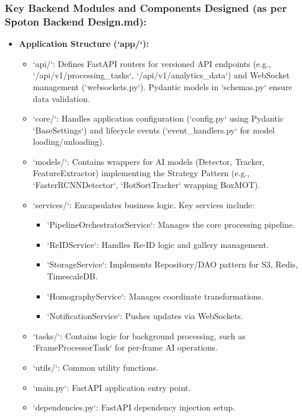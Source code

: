 \begin{itemize}
\subsubsection*{Key Backend Modules and Components Designed (as per Spoton Backend Design.md):}
\begin{itemize}
    \item \textbf{Application Structure (`app/`):}
        \begin{itemize}
            \item `api/`: Defines FastAPI routers for versioned API endpoints (e.g., `/api/v1/processing\_tasks`, `/api/v1/analytics\_data`) and WebSocket management (`websockets.py`). Pydantic models in `schemas.py` ensure data validation.
            \item `core/`: Handles application configuration (`config.py` using Pydantic `BaseSettings`) and lifecycle events (`event\_handlers.py` for model loading/unloading).
            \item `models/`: Contains wrappers for AI models (Detector, Tracker, FeatureExtractor) implementing the Strategy Pattern (e.g., `FasterRCNNDetector`, `BotSortTracker` wrapping BoxMOT).
            \item `services/`: Encapsulates business logic. Key services include:
                \begin{itemize}
                    \item `PipelineOrchestratorService`: Manages the core processing pipeline.
                    \item `ReIDService`: Handles Re-ID logic and gallery management.
                    \item `StorageService`: Implements Repository/DAO pattern for S3, Redis, TimescaleDB.
                    \item `HomographyService`: Manages coordinate transformations.
                    \item `NotificationService`: Pushes updates via WebSockets.
                \end{itemize}
            \item `tasks/`: Contains logic for background processing, such as `FrameProcessorTask` for per-frame AI operations.
            \item `utils/`: Common utility functions.
            \item `main.py`: FastAPI application entry point.
            \item `dependencies.py`: FastAPI dependency injection setup.
        \end{itemize}

\end{itemize}
\end{itemize}

